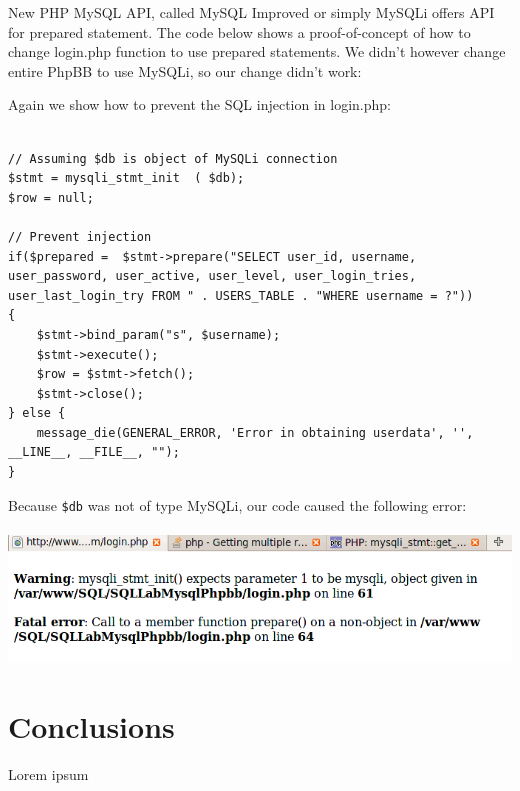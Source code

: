 \documentclass[12pt, a4paper, pdflatex]{article}
\begin{document}
New PHP MySQL API, called MySQL Improved or simply MySQLi\cite{mysqli} offers API for prepared statement. The code below shows a proof-of-concept of how to change login.php function to use prepared statements. We didn't however change entire PhpBB to use MySQLi, so our change didn't work:

Again we show how to prevent the SQL injection in login.php:
\lstset{
	captionpos=b,
	frame=single,
	language=PHP,
	breaklines=true,
	label=sqladdslash
}
\begin{lstlisting}	

// Assuming $db is object of MySQLi connection
$stmt = mysqli_stmt_init  ( $db);
$row = null;

// Prevent injection
if($prepared =  $stmt->prepare("SELECT user_id, username, user_password, user_active, user_level, user_login_tries, user_last_login_try FROM " . USERS_TABLE . "WHERE username = ?"))
{
	$stmt->bind_param("s", $username);
	$stmt->execute();
	$row = $stmt->fetch();
	$stmt->close();
} else {
	message_die(GENERAL_ERROR, 'Error in obtaining userdata', '', __LINE__, __FILE__, "");
}
\end{lstlisting}

Because \texttt{\$db} was not of type MySQLi, our code caused the following error:\\\\
\includegraphics[width=.95\textwidth]{gfx/sql/mysqli.png}
\section{Conclusions}

Lorem ipsum
\vfill


\end{document}
